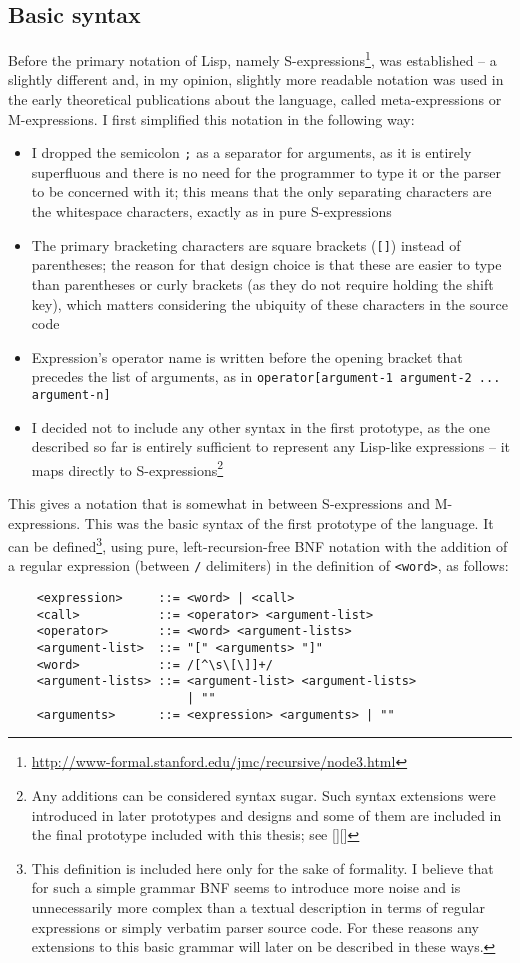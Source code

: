 \subsection{Basic syntax}
Before the primary notation of Lisp, namely S-expressions\footnote{\url{http://www-formal.stanford.edu/jmc/recursive/node3.html}}, was established -- a slightly different and, in my opinion, slightly more readable notation was used in the early theoretical publications about the language, called meta-expressions or M-expressions\cite{mexpr}. I first simplified this notation in the following way:
\begin{itemize}
    \item I dropped the semicolon \texttt{;} as a separator for arguments, as it is entirely superfluous and there is no need for the programmer to type it or the parser to be concerned with it; this means that the only separating characters are the whitespace characters, exactly as in pure S-expressions
    \item The primary bracketing characters are square brackets (\texttt{[]}) instead of parentheses; the reason for that design choice is that these are easier to type than parentheses or curly brackets (as they do not require holding the shift key), which matters considering the ubiquity of these characters in the source code
    \item Expression's operator name is written before the opening bracket that precedes the list of arguments, as in \texttt{operator[argument-1 argument-2 ... argument-n]}
    \item I decided not to include any other syntax in the first prototype, as the one described so far is entirely sufficient to represent any Lisp-like expressions -- it maps directly to S-expressions\footnote{Any additions can be considered syntax sugar. Such syntax extensions were introduced in later prototypes and designs and some of them are included in the final prototype included with this thesis; see [][]} 
\end{itemize}

This gives a notation that is somewhat in between S-expressions and M-expressions. This was the basic syntax of the first prototype of the language. It can be defined\footnote{This definition is included here only for the sake of formality. I believe that for such a simple grammar BNF seems to introduce more noise and is unnecessarily more complex than a textual description in terms of regular expressions or simply verbatim parser source code. For these reasons any extensions to this basic grammar will later on be described in these ways.}, using pure, left-recursion-free BNF notation with the addition of a regular expression (between \texttt{/} delimiters) in the definition of \texttt{<word>}, as follows:
\begin{lstlisting}
    <expression>     ::= <word> | <call>
    <call>           ::= <operator> <argument-list>
    <operator>       ::= <word> <argument-lists>
    <argument-list>  ::= "[" <arguments> "]"
    <word>           ::= /[^\s\[\]]+/
    <argument-lists> ::= <argument-list> <argument-lists>
                         | ""
    <arguments>      ::= <expression> <arguments> | ""
\end{lstlisting}

